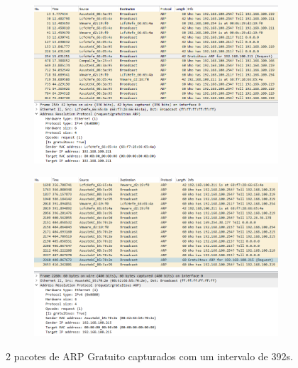 \documentclass{llncs}
\begin{document}
\begin{figure}[h]
  \centering
  \begin{subfigure}{0.4\textwidth}
    \centering
    \includegraphics[width=0.98\linewidth]{./imagens/ARPG1_1.png}
  \end{subfigure}%
  \begin{subfigure}{0.4\textwidth}
    \centering
    \includegraphics[width=0.98\linewidth]{./imagens/ARPG1_2.png}
  \end{subfigure}%
  \caption{2 pacotes de ARP Gratuito capturados com um intervalo de 392s.}
  \label{fig:arpg_1}
\end{figure}
\end{document}
